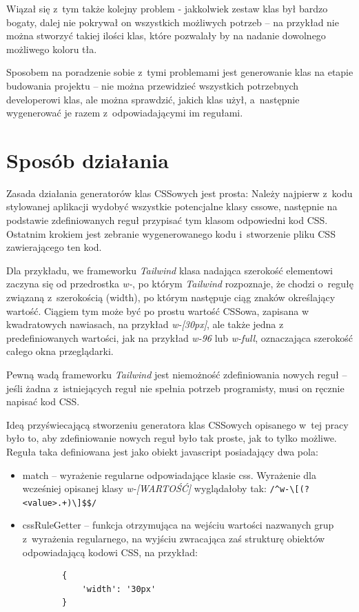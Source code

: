 \documentclass{SGGW-thesis}
\begin{document}
Wiązał się z~tym także kolejny problem - jakkolwiek zestaw klas był bardzo bogaty, dalej nie pokrywał on wszystkich możliwych potrzeb -- na przykład nie można stworzyć takiej ilości klas, które pozwalały by na nadanie dowolnego możliwego koloru tła.

Sposobem na poradzenie sobie z~tymi problemami jest generowanie klas na etapie budowania projektu -- nie można przewidzieć wszystkich potrzebnych developerowi klas, ale można sprawdzić, jakich klas użył, a~następnie wygenerować je razem z~odpowiadającymi im regułami.


\section{Sposób działania}
Zasada działania generatorów klas CSSowych jest prosta: Należy najpierw z~kodu stylowanej aplikacji wydobyć wszystkie potencjalne klasy cssowe, następnie na podstawie zdefiniowanych reguł przypisać tym klasom odpowiedni kod CSS. Ostatnim krokiem jest zebranie wygenerowanego kodu i~stworzenie pliku CSS zawierającego ten kod.

Dla przykładu, we frameworku \emph{Tailwind} klasa nadająca szerokość elementowi zaczyna się od przedrostka \emph{w-}, po którym \emph{Tailwind} rozpoznaje, że chodzi o~regułę związaną z~szerokością (width), po którym następuje ciąg znaków określający wartość. Ciągiem tym może być po prostu wartość CSSowa, zapisana w kwadratowych nawiasach, na przykład \emph{w-[30px]}, ale także jedna z predefiniowanych wartości, jak na przykład \emph{w-96} lub \emph{w-full}, oznaczająca szerokość całego okna przeglądarki\cite{Tailwind_jit}.

Pewną wadą frameworku \emph{Tailwind} jest niemożność zdefiniowania nowych reguł -- jeśli żadna z~istniejących reguł nie spełnia potrzeb programisty, musi on ręcznie napisać kod CSS.

Ideą przyświecającą stworzeniu generatora klas CSSowych opisanego w~tej pracy było to, aby zdefiniowanie nowych reguł było tak proste, jak to tylko możliwe. Reguła taka definiowana jest jako obiekt javascript posiadający dwa pola:
\begin{itemize}
    \item match -- wyrażenie regularne odpowiadające klasie css. Wyrażenie dla wcześniej opisanej klasy \emph{w-[WARTOŚĆ]} wyglądałoby tak: \verb|/^w-\[(?<value>.+)\]$$/|
    \item cssRuleGetter -- funkcja otrzymująca na wejściu wartości nazwanych grup z~wyrażenia regularnego, na wyjściu zwracająca zaś strukturę obiektów odpowiadającą kodowi CSS, na przykład:
    \begin{verbatim}
        {
            'width': '30px'
        }
    \end{verbatim}
\end{itemize}
\end{document}
